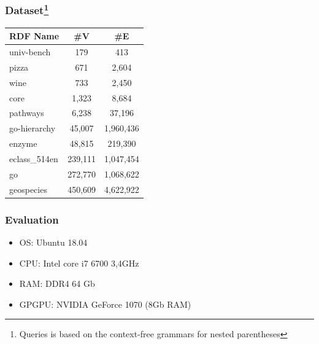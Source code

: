 \documentclass[xcolor=table]{beamer}
\begin{document}
\begin{frame}[fragile] \frametitle{Dataset\footnote{Queries is based on the context-free grammars for 
		nested parentheses}}
\begin{center}
 {\small
	\setlength{\tabcolsep}{0.4em}
	\begin{tabular}{| l | c | c |}
		\hline
		RDF Name                  & \#V    & \#E \\
		\hline
		\hline
		univ-bench					& 179		& 413\\
		pizza						& 671		& 2,604\\
		wine							& 733		& 2,450\\
		core							& 1,323		& 8,684\\
		pathways						& 6,238		& 37,196\\
		go-hierarchy					& 45,007		& 1,960,436    \\
		enzyme						& 48,815		& 219,390     \\
		eclass\_514en				& 239,111		& 1,047,454        \\
		go							& 272,770		& 1,068,622    \\
		geospecies							& 450,609		& 4,622,922    \\
		\hline
	\end{tabular}
}
\end{center} 
\end{frame}

\begin{frame} \frametitle{Evaluation}
  \begin{itemize}
   \item OS: Ubuntu 18.04
   \item CPU: Intel core i7 6700 3,4GHz
   \item RAM: DDR4 64 Gb
   \item GPGPU: NVIDIA GeForce 1070 (8Gb RAM)
  \end{itemize}
\end{frame}
\end{document}
